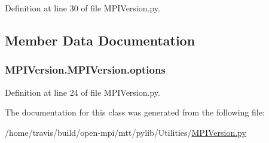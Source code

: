 Definition at line 30 of file M\-P\-I\-Version.\-py.



\subsection{Member Data Documentation}
\hypertarget{class_m_p_i_version_1_1_m_p_i_version_a86d77c651262785c248d819c9cfed3b1}{
\subsubsection[{options}]{\setlength{\rightskip}{0pt plus 5cm}M\-P\-I\-Version.\-M\-P\-I\-Version.\-options}}\label{class_m_p_i_version_1_1_m_p_i_version_a86d77c651262785c248d819c9cfed3b1}


Definition at line 24 of file M\-P\-I\-Version.\-py.



The documentation for this class was generated from the following file\-:\begin{DoxyCompactItemize}
\item 
/home/travis/build/open-\/mpi/mtt/pylib/\-Utilities/\hyperlink{_m_p_i_version_8py}{M\-P\-I\-Version.\-py}\end{DoxyCompactItemize}
